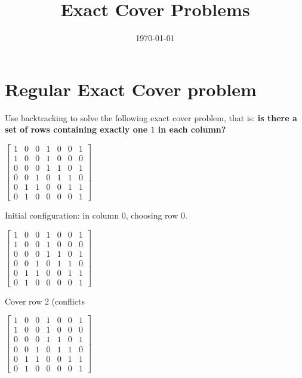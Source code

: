 \documentclass[table]{article}
\title{Exact Cover Problems}
\date{\today}
\begin{document}
\maketitle

\section{Regular Exact Cover problem}

Use backtracking to solve the following exact cover problem, that is: {\bf is there a set of rows containing exactly one $1$ in each column?}
\vspace{1em}

\begin{minipage}{.5\linewidth}
$\begin{bmatrix}
1 & 0 & 0 & 1 & 0 & 0 & 1 \\
1 & 0 & 0 & 1 & 0 & 0 & 0 \\
0 & 0 & 0 & 1 & 1 & 0 & 1 \\
0 & 0 & 1 & 0 & 1 & 1 & 0 \\
0 & 1 & 1 & 0 & 0 & 1 & 1 \\
0 & 1 & 0 & 0 & 0 & 0 & 1 
\end{bmatrix}$
\end{minipage}
\begin{minipage}{.45\linewidth}
Initial configuration: in column 0, choosing row 0.
\end{minipage}

\vspace{1em}


\begin{minipage}{.5\linewidth}
$\begin{bmatrix}
1 & 0 & 0 & 1 & 0 & 0 & 1 \\
1 & 0 & 0 & 1 & 0 & 0 & 0 \\
0 & 0 & 0 & 1 & 1 & 0 & 1 \\
0 & 0 & 1 & 0 & 1 & 1 & 0 \\
0 & 1 & 1 & 0 & 0 & 1 & 1 \\
0 & 1 & 0 & 0 & 0 & 0 & 1 
\end{bmatrix}$
\end{minipage}
\begin{minipage}{.45\linewidth}
\end{minipage}
Cover row 2 (conflicts 
\vspace{1em}


\begin{minipage}{.5\linewidth}
$\begin{bmatrix}
1 & 0 & 0 & 1 & 0 & 0 & 1 \\
1 & 0 & 0 & 1 & 0 & 0 & 0 \\
0 & 0 & 0 & 1 & 1 & 0 & 1 \\
0 & 0 & 1 & 0 & 1 & 1 & 0 \\
0 & 1 & 1 & 0 & 0 & 1 & 1 \\
0 & 1 & 0 & 0 & 0 & 0 & 1 
\end{bmatrix}$
\end{minipage}
\begin{minipage}{.45\linewidth}
\end{minipage}
\end{document}
